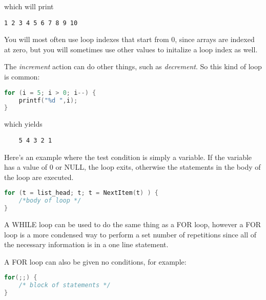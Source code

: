 which will print
\scriptsize
\begin{verbatim}
1 2 3 4 5 6 7 8 9 10 
\end{verbatim}
\normalsize

You will most often use loop indexes that start from 0, since arrays are
indexed at zero, but you will sometimes use other values to initalize a loop
index as well.

The \emph{increment} action can do other things, such as \emph{decrement}. So
this kind of loop is common:

\lstset{basicstyle=\scriptsize, numbers=left, captionpos=b, tabsize=4}
\begin{lstlisting}[caption=Section \thesection listing \arabic{controlcnt},language={C},
breaklines=true,xleftmargin=15pt, label=lst:section\thesection listing\arabic{controlcnt}]
for (i = 5; i > 0; i--) {
	printf("%d ",i);
}
\end{lstlisting}

which yields
\scriptsize
\begin{verbatim}
	5 4 3 2 1 
\end{verbatim}
\normalsize

Here's an example where the test condition is simply a variable. If the
variable has a value of 0 or NULL, the loop exits, otherwise the statements in
the body of the loop are executed.
\lstset{basicstyle=\scriptsize, numbers=left, captionpos=b, tabsize=4}
\begin{lstlisting}[caption=Section \thesection listing \arabic{controlcnt},language={C},
breaklines=true,xleftmargin=15pt, label=lst:section\thesection listing\arabic{controlcnt}]
for (t = list_head; t; t = NextItem(t) ) {
	/*body of loop */
}
\end{lstlisting}

A WHILE loop can be used to do the same thing as a FOR loop, however a FOR loop
is a more condensed way to perform a set number of repetitions since all of the
necessary information is in a one line statement.

A FOR loop can also be given no conditions, for example:

\lstset{basicstyle=\scriptsize, numbers=left, captionpos=b, tabsize=4}
\begin{lstlisting}[caption=Section \thesection listing \arabic{controlcnt},language={C},
breaklines=true,xleftmargin=15pt, label=lst:section\thesection listing\arabic{controlcnt}]
for(;;) {
	/* block of statements */
}
\end{lstlisting}

